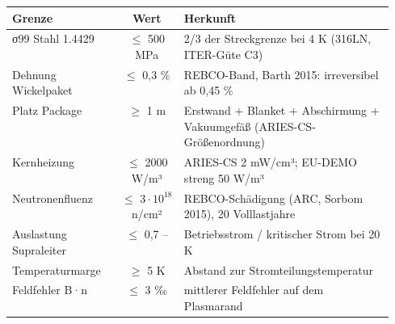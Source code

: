 \begin{tabular}{@{}lcp{0.55\linewidth}@{}}\toprule
Grenze & Wert & Herkunft \\\midrule
σ99 Stahl 1.4429 & $\le$ 500 MPa & 2/3 der Streckgrenze bei 4 K (316LN, ITER-Güte C3) \\
Dehnung Wickelpaket & $\le$ 0,3 \% & REBCO-Band, Barth 2015: irreversibel ab 0,45 \% \\
Platz Package & $\ge$ 1 m & Erstwand + Blanket + Abschirmung + Vakuumgefäß (ARIES-CS-Größenordnung) \\
Kernheizung & $\le$ 2000 W/m³ & ARIES-CS 2 mW/cm³; EU-DEMO streng 50 W/m³ \\
Neutronenfluenz & $\le$ $3\cdot 10^{18}$ n/cm² & REBCO-Schädigung (ARC, Sorbom 2015), 20 Volllastjahre \\
Auslastung Supraleiter & $\le$ 0,7 – & Betriebsstrom / kritischer Strom bei 20 K \\
Temperaturmarge & $\ge$ 5 K & Abstand zur Stromteilungstemperatur \\
Feldfehler B·n & $\le$ 3 ‰ & mittlerer Feldfehler auf dem Plasmarand \\
\bottomrule\end{tabular}
